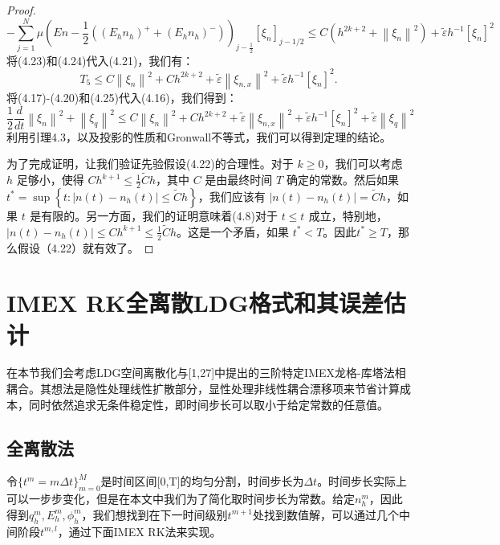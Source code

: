 \begin{proof}
    \begin{equation}
        -\sum_{j=1}^{N} \mu\left(E n-\frac{1}{2}\left(\left(E_{h} n_{h}\right)^{+}+\left(E_{h} n_{h}\right)^{-}\right)\right)_{j-\frac{1}{2}}\left[\xi_{n}\right]_{j-1 / 2} \leq C\left(h^{2 k+2}+\left\|\xi_{n}\right\|^{2}\right)+\tilde{\varepsilon} h^{-1}\left[\xi_{n}\right]^{2}
    \end{equation}
    将(4.23)和(4.24)代入(4.21)，我们有：
    \begin{equation}
        T_{5} \leq C\left\|\xi_{n}\right\|^{2}+C h^{2 k+2}+\tilde{\varepsilon}\left\|\xi_{n, x}\right\|^{2}+\tilde{\varepsilon} h^{-1}\left[\xi_{n}\right]^{2} .
    \end{equation}
    将(4.17)-(4.20)和(4.25)代入(4.16)，我们得到：
    \begin{equation}
        \frac{1}{2} \frac{d}{d t}\left\|\xi_{n}\right\|^{2}+\left\|\xi_{q}\right\|^{2} \leq C\left\|\xi_{n}\right\|^{2}+C h^{2 k+2}+\tilde{\varepsilon}\left\|\xi_{n, x}\right\|^{2}+\tilde{\varepsilon} h^{-1}\left[\xi_{n}\right]^{2}+\tilde{\varepsilon}\left\|\xi_{q}\right\|^{2}
    \end{equation}
    利用引理4.3，以及投影的性质和Gronwall不等式，我们可以得到定理的结论。

    为了完成证明，让我们验证先验假设(4.22)的合理性。对于 $k \geq 0$，我们可以考虑 $h$ 足够小，使得 $C h^{k+1} \leq \frac{1}{2} \tilde{C} h$，其中 $C$ 是由最终时间 $T$ 确定的常数。然后如果 $t^* = \sup \left\{t:\left|n(t)-n_{h}(t)\right| \leq \tilde{C} h\right\}$，我们应该有 $\left|n\left(t^{}\right)-n_{h}\left(t^{}\right)\right|=\tilde{C} h$，如果 $t^{}$ 是有限的。另一方面，我们的证明意味着(4.8)对于 $t \leq t^{}$ 成立，特别地，$\left|n\left(t^{}\right)-n_{h}\left(t^{}\right)\right| \leq C h^{k+1} \leq \frac{1}{2} \tilde{C} h$。这是一个矛盾，如果 $t^* < T$。因此$t^* \geq T$，那么假设（4.22）就有效了。
\end{proof}

\section{IMEX RK全离散LDG格式和其误差估计}
在本节我们会考虑LDG空间离散化与[1,27]中提出的三阶特定IMEX龙格-库塔法相耦合。其想法是隐性处理线性扩散部分，显性处理非线性耦合漂移项来节省计算成本，同时依然追求无条件稳定性，即时间步长可以取小于给定常数的任意值。
\subsection{全离散法}
令$\{t^m = m\Delta t\}^M_{m = 0}$是时间区间[0,T]的均匀分割，时间步长为$\Delta t$。时间步长实际上可以一步步变化，但是在本文中我们为了简化取时间步长为常数。给定$n_h^m$，因此得到$q_h^m,E_h^m,\phi_h^m$，我们想找到在下一时间级别$t^{m+1}$处找到数值解，可以通过几个中间阶段$t^{m,l}$，通过下面IMEX RK法来实现。

